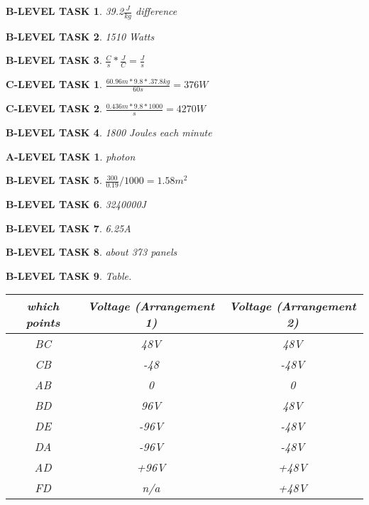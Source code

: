 \documentclass{book}
\numberwithin{equation}{section}
\newtheorem{alevel}{A-LEVEL TASK}
\newtheorem{blevel}{B-LEVEL TASK}
\newtheorem{clevel}{C-LEVEL TASK}
\theoremstyle{definition}
\begin{document}
\begin{blevel}39.2$\frac{J}{kg}$ difference\end{blevel}
\begin{blevel}1510 Watts\end{blevel}
\begin{blevel}$\frac{C}{s}*\frac{J}{C}=\frac{J}{s}$\end{blevel}
\begin{clevel}$\frac{60.96m*9.8*.37.8kg}{60s}=376W$\end{clevel}
\begin{clevel}$\frac{0.436m*9.8*1000}{s}=4270W$\end{clevel}
\begin{blevel}1800 Joules each minute\end{blevel}
\begin{alevel}photon\end{alevel}
\begin{blevel}$\frac{300}{0.19}/1000=1.58m^2$\end{blevel}
\begin{blevel}3240000J\end{blevel}
\begin{blevel}6.25A\end{blevel}
\begin{blevel}about 373 panels\end{blevel}

\begin{blevel}Table.\par
\begin{table}[H]
\begin{center}
\begin{tabular}{|c|c|c|}\hline
which points	& Voltage (Arrangement 1)&Voltage (Arrangement 2) \\ \hline
BC & 48V& 48V\\ \hline
CB & -48& -48V\\ \hline
AB & 0& 0\\ \hline
BD & 96V& 48V\\ \hline
DE & -96V& -48V\\ \hline
DA & -96V& -48V\\ \hline
AD & +96V& +48V\\ \hline
FD & n/a &+48V \\ \hline	
\end{tabular}
\end{center}
\end{table}
\end{blevel}
\end{document}

